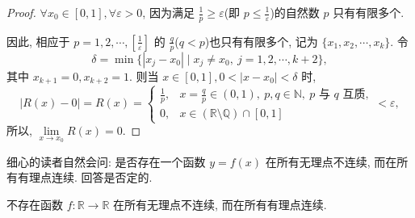 \begin{proof}
$\forall x_0 \in [0, 1], \forall \varepsilon > 0$, 因为满足 $\frac{1}{p} \geqslant \varepsilon$(即 $p \leqslant \frac{1}{\varepsilon}$)的自然数 $p$ 只有有限多个.

因此, 相应于 $p = 1, 2, \cdots, \left[\frac{1}{\varepsilon}\right]$ 的 $\frac{q}{p}$($q < p$)也只有有限多个, 记为 $\{x_1, x_2, \cdots, x_k\}$. 令
\[
\delta = \min\{|x_j - x_0| \mid x_j \neq x_0,\ j = 1, 2, \cdots, k+2\},
\]
其中 $x_{k+1} = 0, x_{k+2} = 1$. 则当 $x \in [0, 1], 0 < |x - x_0| < \delta$ 时,
\[
|R(x) - 0| = R(x) = \begin{cases} \frac{1}{p}, & x = \frac{q}{p} \in (0, 1),\ p, q \in \mathbb{N},\ p \text{ 与 } q \text{ 互质}, \\ 0, & x \in (\mathbb{R} \setminus \mathbb{Q}) \cap [0, 1] \end{cases} < \varepsilon,
\]
所以, $\lim\limits_{x \to x_0} R(x) = 0$.
\end{proof}

细心的读者自然会问: 是否存在一个函数 $y = f(x)$ 在所有无理点不连续, 而在所有有理点连续. 回答是否定的.

\begin{example}\label{ex:2.4.7}
不存在函数 $f: \mathbb{R} \to \mathbb{R}$ 在所有无理点不连续, 而在所有有理点连续.
\end{example}

